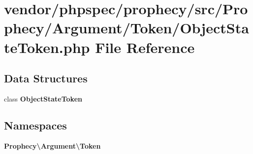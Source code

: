 \section{vendor/phpspec/prophecy/src/\+Prophecy/\+Argument/\+Token/\+Object\+State\+Token.php File Reference}
\label{_object_state_token_8php}
\subsection*{Data Structures}
\begin{DoxyCompactItemize}
\item 
class {\bf Object\+State\+Token}
\end{DoxyCompactItemize}
\subsection*{Namespaces}
\begin{DoxyCompactItemize}
\item 
 {\bf Prophecy\textbackslash{}\+Argument\textbackslash{}\+Token}
\end{DoxyCompactItemize}
